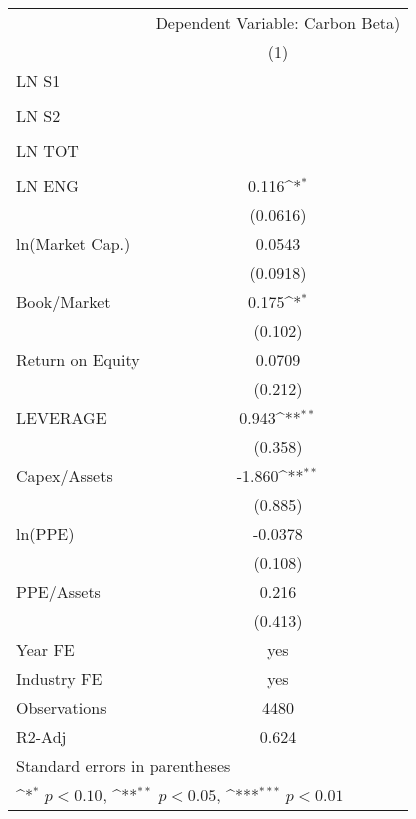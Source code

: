 {
\def\sym#1{\ifmmode^{#1}\else\(^{#1}\)\fi}
\begin{tabular}{l*{1}{c}}
\hline\hline
                    &\multicolumn{1}{c}{Dependent Variable: Carbon Beta) }\\\cmidrule(lr){2-2}
                    &\multicolumn{1}{c}{(1)}         \\
\hline
LN S1               &                     \\
                    &                     \\
LN S2               &                     \\
                    &                     \\
LN TOT              &                     \\
                    &                     \\
LN ENG              &       0.116\sym{*}  \\
                    &    (0.0616)         \\
ln(Market Cap.)     &      0.0543         \\
                    &    (0.0918)         \\
Book/Market         &       0.175\sym{*}  \\
                    &     (0.102)         \\
Return on Equity    &      0.0709         \\
                    &     (0.212)         \\
LEVERAGE            &       0.943\sym{**} \\
                    &     (0.358)         \\
Capex/Assets        &      -1.860\sym{**} \\
                    &     (0.885)         \\
ln(PPE)             &     -0.0378         \\
                    &     (0.108)         \\
PPE/Assets          &       0.216         \\
                    &     (0.413)         \\
\hline
Year FE             &         yes         \\
Industry FE         &         yes         \\
Observations        &        4480         \\
R2-Adj              &       0.624         \\
\hline\hline
\multicolumn{2}{l}{\footnotesize Standard errors in parentheses}\\
\multicolumn{2}{l}{\footnotesize \sym{*} \(p<0.10\), \sym{**} \(p<0.05\), \sym{***} \(p<0.01\)}\\
\end{tabular}
}
